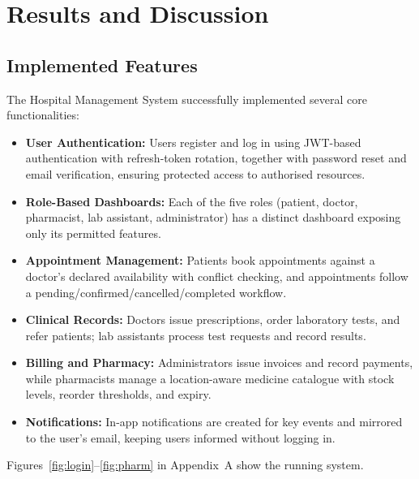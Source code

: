 \documentclass[12pt,a4paper]{report}
\begin{document}
\chapter{Results and Discussion}

\section{Implemented Features}
The Hospital Management System successfully implemented several core functionalities:
\begin{itemize}[leftmargin=1.4em]
  \item \textbf{User Authentication:} Users register and log in using JWT-based
        authentication with refresh-token rotation, together with password reset and
        email verification, ensuring protected access to authorised resources.
  \item \textbf{Role-Based Dashboards:} Each of the five roles (patient, doctor,
        pharmacist, lab assistant, administrator) has a distinct dashboard exposing
        only its permitted features.
  \item \textbf{Appointment Management:} Patients book appointments against a doctor's
        declared availability with conflict checking, and appointments follow a
        pending/confirmed/cancelled/completed workflow.
  \item \textbf{Clinical Records:} Doctors issue prescriptions, order laboratory tests,
        and refer patients; lab assistants process test requests and record results.
  \item \textbf{Billing and Pharmacy:} Administrators issue invoices and record
        payments, while pharmacists manage a location-aware medicine catalogue with
        stock levels, reorder thresholds, and expiry.
  \item \textbf{Notifications:} In-app notifications are created for key events and
        mirrored to the user's email, keeping users informed without logging in.
\end{itemize}
Figures~\ref{fig:login}--\ref{fig:pharm} in Appendix~A show the running system.
\end{document}

